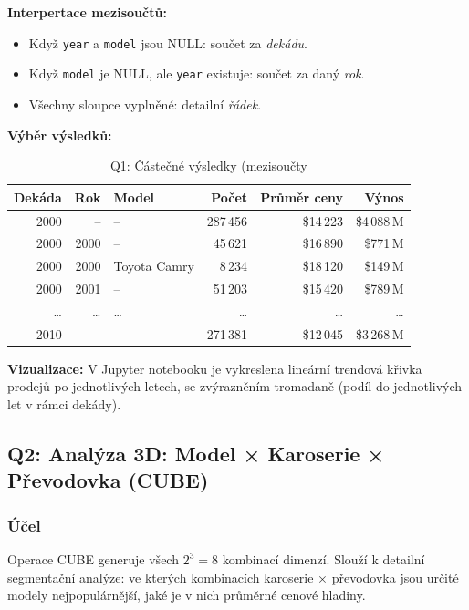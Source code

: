 \documentclass[12pt,a4paper]{article}
\begin{document}
\textbf{Interpertace mezisoučtů:}
\begin{itemize}
    \item Když \texttt{year} a \texttt{model} jsou NULL: součet za \textit{dekádu}.
    \item Když \texttt{model} je NULL, ale \texttt{year} existuje: součet za daný \textit{rok}.
    \item Všechny sloupce vyplněné: detailní \textit{řádek}.
\end{itemize}

\vspace{0.5cm}
\textbf{Výběr výsledků:}

\begin{table}[H]
    \centering
    \small
    \begin{tabular}{|r|r|l|r|r|r|}
        \hline
        \textbf{Dekáda} & \textbf{Rok} & \textbf{Model} & \textbf{Počet} & \textbf{Průměr ceny} & \textbf{Výnos} \\
        \hline
        2000 & – & – & 287\,456 & \$14\,223 & \$4\,088\,M \\
        2000 & 2000 & – & 45\,621 & \$16\,890 & \$771\,M \\
        2000 & 2000 & Toyota Camry & 8\,234 & \$18\,120 & \$149\,M \\
        2000 & 2001 & – & 51\,203 & \$15\,420 & \$789\,M \\
        \ldots & \ldots & \ldots & \ldots & \ldots & \ldots \\
        2010 & – & – & 271\,381 & \$12\,045 & \$3\,268\,M \\
        \hline
    \end{tabular}
    \caption{Q1: Částečné výsledky (mezisoučty}
\end{table}

\textbf{Vizualizace:} V Jupyter notebooku je vykreslena lineární trendová křivka prodejů
po jednotlivých letech, se zvýrazněním tromadaně (podíl do jednotlivých let v rámci dekády).

\subsection{Q2: Analýza 3D: Model × Karoserie × Převodovka (CUBE)}

\subsubsection{Účel}

Operace CUBE generuje všech $2^3 = 8$ kombinací dimenzí. Slouží k detailní segmentační analýze:
ve kterých kombinacích karoserie × převodovka jsou určité modely nejpopulárnější,
jaké je v nich průměrné cenové hladiny.
\end{document}
